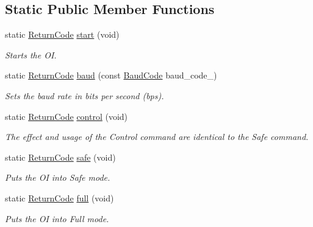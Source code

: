 \subsection*{Static Public Member Functions}
\begin{DoxyCompactItemize}
\item 
static \hyperlink{namespaceroomba_aff53babe0af88b1ea8b066fd18b8f23f}{Return\+Code} \hyperlink{classroomba_1_1_open_interface_a9a55a3f5a4ff10ae6452ffcec6dd80a7}{start} (void)
\begin{DoxyCompactList}\small\item\em Starts the O\+I. \end{DoxyCompactList}\item 
static \hyperlink{namespaceroomba_aff53babe0af88b1ea8b066fd18b8f23f}{Return\+Code} \hyperlink{classroomba_1_1_open_interface_a4f90f2d77ee1a99616934bcc63044c97}{baud} (const \hyperlink{namespaceroomba_a303ba447b12fc77bc24977a1a7ec6d6c}{Baud\+Code} baud\+\_\+code\+\_\+)
\begin{DoxyCompactList}\small\item\em Sets the baud rate in bits per second (bps). \end{DoxyCompactList}\item 
static \hyperlink{namespaceroomba_aff53babe0af88b1ea8b066fd18b8f23f}{Return\+Code} \hyperlink{classroomba_1_1_open_interface_a414ce50d279ed418660c29196e27f2f2}{control} (void)
\begin{DoxyCompactList}\small\item\em The effect and usage of the Control command are identical to the Safe command. \end{DoxyCompactList}\item 
static \hyperlink{namespaceroomba_aff53babe0af88b1ea8b066fd18b8f23f}{Return\+Code} \hyperlink{classroomba_1_1_open_interface_a3fe71d50263839dd40838af6adf5f56f}{safe} (void)
\begin{DoxyCompactList}\small\item\em Puts the O\+I into Safe mode. \end{DoxyCompactList}\item 
static \hyperlink{namespaceroomba_aff53babe0af88b1ea8b066fd18b8f23f}{Return\+Code} \hyperlink{classroomba_1_1_open_interface_a649c060ea8628d7189d5d588bf224eb4}{full} (void)
\begin{DoxyCompactList}\small\item\em Puts the O\+I into Full mode. \end{DoxyCompactList}\item 

\end{DoxyCompactItemize}

